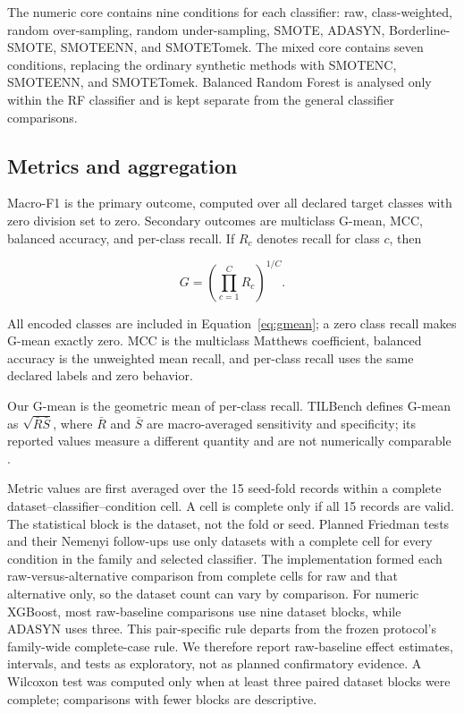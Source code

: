 \documentclass[10pt]{article}
\begin{document}
The numeric core contains nine conditions for each classifier: raw, class-weighted, random over-sampling, random under-sampling, SMOTE, ADASYN, Borderline-SMOTE, SMOTEENN, and SMOTETomek. The mixed core contains seven conditions, replacing the ordinary synthetic methods with SMOTENC, SMOTEENN, and SMOTETomek. Balanced Random Forest is analysed only within the RF classifier and is kept separate from the general classifier comparisons.

\subsection{Metrics and aggregation}

Macro-F1 is the primary outcome, computed over all declared target classes with zero division set to zero. Secondary outcomes are multiclass G-mean, MCC, balanced accuracy, and per-class recall. If $R_c$ denotes recall for class $c$, then

\begin{equation}
G = \left(\prod_{c=1}^{C} R_c\right)^{1/C}.
\label{eq:gmean}
\end{equation}

All encoded classes are included in Equation~\ref{eq:gmean}; a zero class recall makes G-mean exactly zero. MCC is the multiclass Matthews coefficient, balanced accuracy is the unweighted mean recall, and per-class recall uses the same declared labels and zero behavior.

Our G-mean is the geometric mean of per-class recall. TILBench defines G-mean as $\sqrt{\bar{R}\bar{S}}$, where $\bar{R}$ and $\bar{S}$ are macro-averaged sensitivity and specificity; its reported values measure a different quantity and are not numerically comparable \citep{liu2026tilbenchv2}.

Metric values are first averaged over the 15 seed-fold records within a complete dataset--classifier--condition cell. A cell is complete only if all 15 records are valid. The statistical block is the dataset, not the fold or seed. Planned Friedman tests and their Nemenyi follow-ups use only datasets with a complete cell for every condition in the family and selected classifier. The implementation formed each raw-versus-alternative comparison from complete cells for raw and that alternative only, so the dataset count can vary by comparison. For numeric XGBoost, most raw-baseline comparisons use nine dataset blocks, while ADASYN uses three. This pair-specific rule departs from the frozen protocol's family-wide complete-case rule. We therefore report raw-baseline effect estimates, intervals, and tests as exploratory, not as planned confirmatory evidence. A Wilcoxon test was computed only when at least three paired dataset blocks were complete; comparisons with fewer blocks are descriptive.
\end{document}
